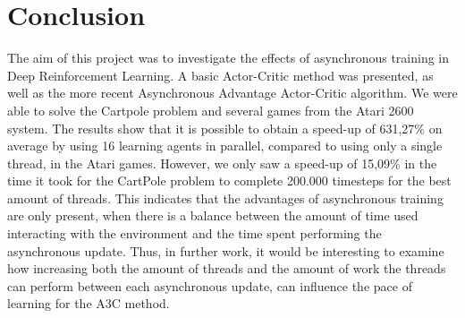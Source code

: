 \documentclass[11pt]{article}
\begin{document}
\section{Conclusion}

The aim of this project was to investigate the effects of asynchronous
training in Deep Reinforcement Learning.
A basic Actor-Critic method was presented,
as well as the more recent Asynchronous Advantage Actor-Critic algorithm.
We were able to solve the Cartpole problem and several games from the
Atari 2600 system.
The results show that it is possible to obtain a
speed-up of 631,27\% on average by using 16 learning agents in parallel, compared to
using only a single thread, in the Atari games.
However, we only saw a speed-up of 15,09\% in the time it took for the CartPole problem
to complete 200.000 timesteps for the best amount of threads.
This indicates that the advantages of asynchronous training are only present, when
there is a balance between the amount of time used interacting with the environment
and the time spent performing the asynchronous update.
Thus, in further work, it would be interesting to examine how increasing
both the amount of threads and the amount of work the threads can perform between each
asynchronous update, can influence the pace of learning for the A3C method.
\end{document}
